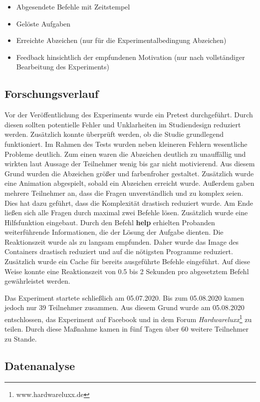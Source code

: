 \begin{itemize}
	 \item Abgesendete Befehle mit Zeitstempel
	 \item Gelöste Aufgaben 
	 \item Erreichte Abzeichen (nur für die Experimentalbedingung Abzeichen)
	 \item Feedback hinsichtlich der empfundenen Motivation (nur nach vollständiger Bearbeitung des Experiments)
\end{itemize}


\subsection{Forschungsverlauf}
Vor der Veröffentlichung des Experiments wurde ein Pretest durchgeführt. Durch diesen sollten potentielle Fehler und Unklarheiten im Studiendesign reduziert werden. Zusätzlich konnte überprüft werden, ob die Studie grundlegend funktioniert. Im Rahmen des Tests wurden neben kleineren Fehlern wesentliche Probleme deutlich. Zum einen waren die Abzeichen deutlich zu unauffällig und wirkten laut Aussage der Teilnehmer wenig bis gar nicht motivierend. Aus diesem Grund wurden die Abzeichen größer und farbenfroher gestaltet. Zusätzlich wurde eine Animation abgespielt, sobald ein Abzeichen erreicht wurde. Außerdem gaben mehrere Teilnehmer an, dass die Fragen unverständlich und zu komplex seien. Dies hat dazu geführt, dass die Komplexität drastisch reduziert wurde. Am Ende ließen sich alle Fragen durch maximal zwei Befehle lösen. Zusätzlich wurde eine Hilfsfunktion eingebaut. Durch den Befehl \textbf{help} erhielten Probanden weiterführende Informationen, die der Lösung der Aufgabe dienten. Die Reaktionszeit wurde als zu langsam empfunden. Daher wurde das Image des Containers drastisch reduziert und auf die nötigsten Programme reduziert. Zusätzlich wurde ein Cache für bereits ausgeführte Befehle eingeführt. Auf diese Weise konnte eine Reaktionszeit von 0.5 bis 2 Sekunden pro abgesetztem Befehl gewährleistet werden.

Das Experiment startete schließlich am 05.07.2020. Bis zum 05.08.2020 kamen jedoch nur 39 Teilnehmer zusammen. Aus diesem Grund wurde am 05.08.2020 entschlossen, das Experiment auf Facebook und in dem Forum \textit{Hardwareluxx}\footnote{www.hardwareluxx.de} zu teilen. Durch diese Maßnahme kamen in fünf Tagen über 60 weitere Teilnehmer zu Stande.

\subsection{Datenanalyse}

